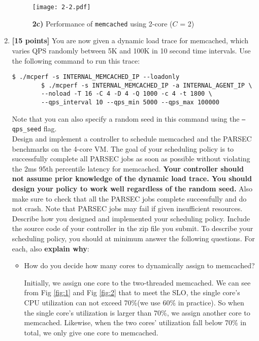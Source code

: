 \documentclass[11pt]{article}
\begin{document}
\begin{enumerate}
    \begin{figure}[!htbp]
        \centering
        \texttt{[image: 2-2.pdf]}
        \caption{\textbf{2c)} Performance of \texttt{memcached} using 2-core ($C$ = 2)}
    \end{figure} 



    \item \textbf{[15 points]} You are now given a dynamic load trace for memcached, which varies QPS randomly between 5K and 100K in 10 second time intervals. Use the following command to run this trace: 
    \begin{Verbatim}[fontsize=\small]
        $ ./mcperf -s INTERNAL_MEMCACHED_IP --loadonly 
        $ ./mcperf -s INTERNAL_MEMCACHED_IP -a INTERNAL_AGENT_IP \ 
        --noload -T 16 -C 4 -D 4 -Q 1000 -c 4 -t 1800 \ 
        --qps_interval 10 --qps_min 5000 --qps_max 100000
    \end{Verbatim}
    
    Note that you can also specify a random seed in this command using the \texttt{--qps\_seed} flag. \\

    Design and implement a controller to schedule memcached and the PARSEC benchmarks on the 4-core VM. The goal of your scheduling policy is to successfully complete all PARSEC jobs as soon as possible without violating the 2ms 95th percentile latency for memcached. \textbf{Your controller should not assume prior knowledge of the dynamic load trace. You should design your policy to work well regardless of the random seed.} Also make sure to check that all the PARSEC jobs complete successfully and do not crash. Note that PARSEC jobs may fail if given insufficient resources. \\
    
    Describe how you designed and implemented your scheduling policy. Include the source code of your controller in the zip file you submit. To describe your scheduling policy, you should at minimum answer the following questions. For each, also \textbf{explain why}:
    \begin{itemize}
        \item How do you decide how many cores to dynamically assign to memcached? 

        Initially, we assign one core to the two-threaded memcached.
        We can see from Fig \ref{fig:1} and Fig \ref{fig:2} that to meet the SLO, the single core's CPU utilization
        can not exceed 70\%(we use 60\% in practice). So when the single core's utilization is larger than 70\%, we assign another core to memcached. Likewise, when the two cores' utilization fall below 70\% in total, we only give one core to memcached. 



\end{itemize}
\end{enumerate}
\end{document}
